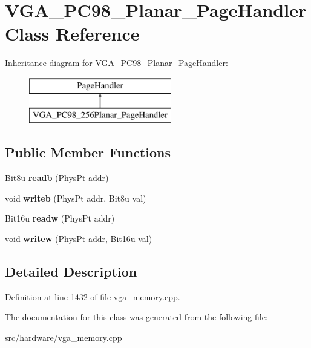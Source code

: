 \hypertarget{classVGA__PC98__256Planar__PageHandler}{\section{V\-G\-A\-\_\-\-P\-C98\-\_\-Planar\-\_\-\-Page\-Handler Class Reference}
\label{classVGA__PC98__256Planar__PageHandler}
}
Inheritance diagram for V\-G\-A\-\_\-\-P\-C98\-\_\-Planar\-\_\-\-Page\-Handler\-:\begin{figure}[H]
\begin{center}
\leavevmode
\includegraphics[height=2.000000cm]{classVGA__PC98__256Planar__PageHandler}
\end{center}
\end{figure}
\subsection*{Public Member Functions}
\begin{DoxyCompactItemize}
\item 
\hypertarget{classVGA__PC98__256Planar__PageHandler_a29dc2143b0322e3e1f4f35db0c1d74b9}{Bit8u {\bfseries readb} (Phys\-Pt addr)}\label{classVGA__PC98__256Planar__PageHandler_a29dc2143b0322e3e1f4f35db0c1d74b9}

\item 
\hypertarget{classVGA__PC98__256Planar__PageHandler_aa105562f74f5ce9b5eaa9f63bdde58cf}{void {\bfseries writeb} (Phys\-Pt addr, Bit8u val)}\label{classVGA__PC98__256Planar__PageHandler_aa105562f74f5ce9b5eaa9f63bdde58cf}

\item 
\hypertarget{classVGA__PC98__256Planar__PageHandler_ab0ea5a0e50cf5475b255be9817509adf}{Bit16u {\bfseries readw} (Phys\-Pt addr)}\label{classVGA__PC98__256Planar__PageHandler_ab0ea5a0e50cf5475b255be9817509adf}

\item 
\hypertarget{classVGA__PC98__256Planar__PageHandler_a2e95c91ae5e4a008bd9a0ba5a1b536ec}{void {\bfseries writew} (Phys\-Pt addr, Bit16u val)}\label{classVGA__PC98__256Planar__PageHandler_a2e95c91ae5e4a008bd9a0ba5a1b536ec}

\end{DoxyCompactItemize}


\subsection{Detailed Description}


Definition at line 1432 of file vga\-\_\-memory.\-cpp.



The documentation for this class was generated from the following file\-:\begin{DoxyCompactItemize}
\item 
src/hardware/vga\-\_\-memory.\-cpp\end{DoxyCompactItemize}
